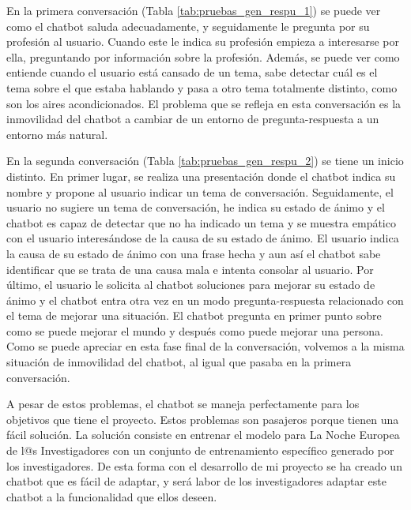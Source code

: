 En la primera conversación (Tabla \ref{tab:pruebas_gen_respu_1}) se puede ver como el chatbot saluda adecuadamente, y seguidamente le pregunta por su profesión al usuario. Cuando este le indica su profesión empieza a interesarse por ella, preguntando por información sobre la profesión. Además, se puede ver como entiende cuando el usuario está cansado de un tema, sabe detectar cuál es el tema sobre el que estaba hablando y pasa a otro tema totalmente distinto, como son los aires acondicionados. El problema que se refleja en esta conversación es la inmovilidad del chatbot a cambiar de un entorno de pregunta-respuesta a un entorno más natural.

En la segunda conversación (Tabla \ref{tab:pruebas_gen_respu_2}) se tiene un inicio distinto. En primer lugar, se realiza una presentación donde el chatbot indica su nombre y propone al usuario indicar un tema de conversación. Seguidamente, el usuario no sugiere un tema de conversación, he indica su estado de ánimo y el chatbot es capaz de detectar que no ha indicado un tema y se muestra empático con el usuario interesándose de la causa de su estado de ánimo. El usuario indica la causa de su estado de ánimo con una frase hecha y aun así el chatbot sabe identificar que se trata de una causa mala e intenta consolar al usuario. Por último, el usuario le solicita al chatbot soluciones para mejorar su estado de ánimo y el chatbot entra otra vez en un modo pregunta-respuesta relacionado con el tema de mejorar una situación. El chatbot pregunta en primer punto sobre como se puede mejorar el mundo y después como puede mejorar una persona. Como se puede apreciar en esta fase final de la conversación, volvemos a la misma situación de inmovilidad del chatbot, al igual que pasaba en la primera conversación.

A pesar de estos problemas, el chatbot se maneja perfectamente para los objetivos que tiene el proyecto. Estos problemas son pasajeros porque tienen una fácil solución. La solución consiste en entrenar el modelo para La Noche Europea de l@s Investigadores con un conjunto de entrenamiento específico generado por los investigadores. De esta forma con el desarrollo de mi proyecto se ha creado un chatbot que es fácil de adaptar, y será labor de los investigadores adaptar este chatbot a la funcionalidad que ellos deseen.


